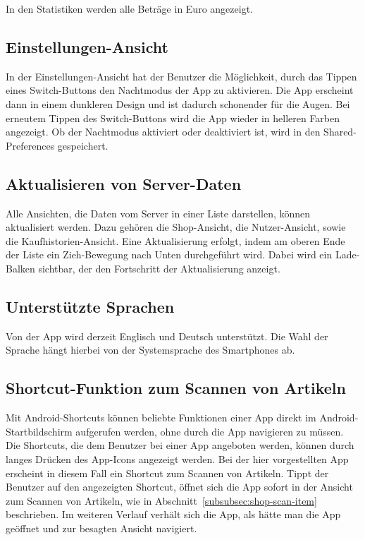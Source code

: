 In den Statistiken werden alle Beträge in Euro angezeigt.


\subsection{Einstellungen-Ansicht} \label{subsec:settings-screen}

In der Einstellungen-Ansicht hat der Benutzer die Möglichkeit, durch das Tippen eines Switch-Buttons den Nachtmodus der App zu aktivieren.
Die App erscheint dann in einem dunkleren Design und ist dadurch schonender für die Augen.
Bei erneutem Tippen des Switch-Buttons wird die App wieder in helleren Farben angezeigt.
Ob der Nachtmodus aktiviert oder deaktiviert ist, wird in den Shared-Preferences gespeichert.

\subsection{Aktualisieren von Server-Daten}\label{subsec:aktualisieren-von-server-daten}

Alle Ansichten, die Daten vom Server in einer Liste darstellen, können aktualisiert werden.
Dazu gehören die Shop-Ansicht, die Nutzer-Ansicht, sowie die Kaufhistorien-Ansicht.
Eine Aktualisierung erfolgt, indem am oberen Ende der Liste ein Zieh-Bewegung nach Unten durchgeführt wird.
Dabei wird ein Lade-Balken sichtbar, der den Fortschritt der Aktualisierung anzeigt.

\subsection{Unterstützte Sprachen} \label{subsec:languages}

Von der App wird derzeit Englisch und Deutsch unterstützt.
Die Wahl der Sprache hängt hierbei von der Systemsprache des Smartphones ab.

\subsection{Shortcut-Funktion zum Scannen von Artikeln} \label{subsec:scan-item-shortcut}

Mit Android-Shortcuts können beliebte Funktionen einer App direkt im Android-Startbildschirm aufgerufen werden, ohne durch die App navigieren zu müssen.
Die Shortcuts, die dem Benutzer bei einer App angeboten werden, können durch langes Drücken des App-Icons angezeigt werden.
Bei der hier vorgestellten App erscheint in diesem Fall ein Shortcut zum Scannen von Artikeln.
Tippt der Benutzer auf den angezeigten Shortcut, öffnet sich die App sofort in der Ansicht zum Scannen von Artikeln, wie in Abschnitt~\ref{subsubsec:shop-scan-item} beschrieben.
Im weiteren Verlauf verhält sich die App, als hätte man die App geöffnet und zur besagten Ansicht navigiert.
